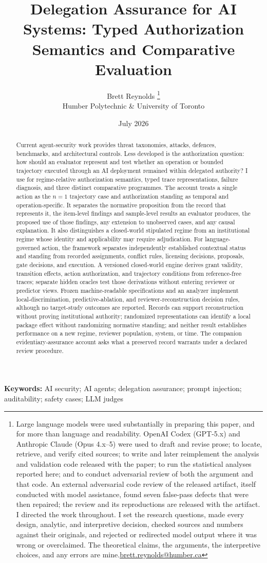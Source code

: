\documentclass[12pt]{article}
\title{Delegation Assurance for AI Systems: Typed Authorization Semantics and Comparative Evaluation}
\author{Brett Reynolds \orcidlink{0000-0003-0073-7195}%
\thanks{Large language models were used substantially in preparing this paper, and for more than language and readability. OpenAI Codex (GPT-5.x) and Anthropic Claude (Opus 4.x--5) were used to draft and revise prose; to locate, retrieve, and verify cited sources; to write and later reimplement the analysis and validation code released with the paper; to run the statistical analyses reported here; and to conduct adversarial review of both the argument and that code. An external adversarial code review of the released artifact, itself conducted with model assistance, found seven false-pass defects that were then repaired; the review and its reproductions are released with the artifact. I directed the work throughout. I set the research questions, made every design, analytic, and interpretive decision, checked sources and numbers against their originals, and rejected or redirected model output where it was wrong or overclaimed. The theoretical claims, the arguments, the interpretive choices, and any errors are mine.\href{mailto:brett.reynolds@humber.ca}{brett.reynolds@humber.ca}}\\
Humber Polytechnic \& University of Toronto}
\date{July 2026}
\begin{document}
\maketitle

\begin{abstract}
Current agent-security work provides threat taxonomies, attacks, defences, benchmarks, and architectural controls. Less developed is the authorization question: how should an evaluator represent and test whether an operation or bounded trajectory executed through an AI deployment remained within delegated authority? I use  for regime-relative authorization semantics, typed trace representations, failure diagnosis, and three distinct comparative programmes. The account treats a single action as the \(n=1\) trajectory case and authorization standing as temporal and operation-specific. It separates the normative proposition from the record that represents it, the item-level findings and sample-level results an evaluator produces, the proposed use of those findings, any extension to unobserved cases, and any causal explanation. It also distinguishes a closed-world stipulated regime from an institutional regime whose identity and applicability may require adjudication. For language-governed action, the framework separates independently established contextual status and standing from recorded assignments, conflict rules, licensing decisions, proposals, gate decisions, and execution. A versioned closed-world engine derives grant validity, transition effects, action authorization, and trajectory conditions from reference-free traces; separate hidden oracles test those derivations without entering reviewer or predictor views. Frozen machine-readable specifications and an analyzer implement local-discrimination, predictive-ablation, and reviewer-reconstruction decision rules, although no target-study outcomes are reported. Records can support reconstruction without proving institutional authority; randomized representations can identify a local package effect without randomizing normative standing; and neither result establishes performance on a new regime, reviewer population, system, or time. The companion evidentiary-assurance account asks what a preserved record warrants under a declared review procedure.
\end{abstract}

\noindent\textbf{Keywords:} AI security; AI agents; delegation assurance; prompt injection; auditability; safety cases; LLM judges








\clearpage



\clearpage
\begingroup
\renewcommand*{\bibfont}{\small}
\setlength{\bibitemsep}{0.25\baselineskip}
\printbibliography
\endgroup
\end{document}
